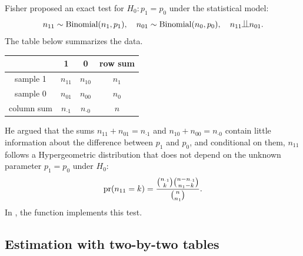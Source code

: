 Fisher  proposed an exact test for $H_0: p_1 = p_0$ under the statistical model: 
$$
n_{11} \sim \text{Binomial}(n_1, p_1),\quad
n_{01} \sim \text{Binomial}(n_0, p_0),\quad 
n_{11} \ind n_{01}.
$$
The table below summarizes the data.

\begin{center}
\begin{tabular}{cccc}
\hline 
 & 1 & 0 & row sum \\
 \hline 
sample 1 & $n_{11}$ & $n_{10}$ & $n_1$ \\
sample 0 & $n_{01}$ & $n_{00}$ & $n_0$ \\
column sum & $n_{\cdot 1}$ & $n_{\cdot 0}$ & $n$ \\
\hline 
\end{tabular}
\end{center}





He argued that the sums $n_{11}  + n_{01}  =  n_{\cdot 1}$ and $n_{10}  + n_{00}  =  n_{\cdot 0}$ contain little information about the difference between $p_1$ and $p_0$, and conditional on them, $n_{11}$  follows a  Hypergeometric distribution that does not depend on the unknown parameter $p_1=p_0$ under $H_0$:
$$
\textup{pr}(n_{11} = k )  = \frac{  \binom{ n_{\cdot 1} }{  k }  \binom{  n -  n_{\cdot 1} }{  n_1 - k   }  }{  \binom{  n }{ n_1 }  }.
$$
In , the function  implements this test. 



\subsection{Estimation with two-by-two tables}\label{section::asymptotic-inference-2x2}


